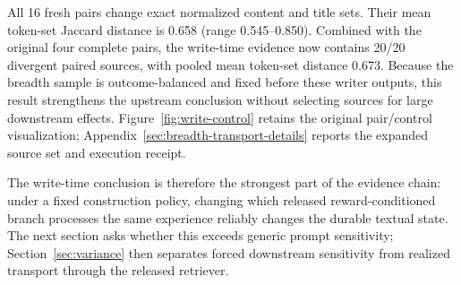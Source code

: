 All 16 fresh pairs change exact normalized content and title sets. Their mean token-set Jaccard distance is 0.658 (range 0.545--0.850). Combined with the original four complete pairs, the write-time evidence now contains 20/20 divergent paired sources, with pooled mean token-set distance 0.673. Because the breadth sample is outcome-balanced and fixed before these writer outputs, this result strengthens the upstream conclusion without selecting sources for large downstream effects. Figure~\ref{fig:write-control} retains the original pair/control visualization; Appendix~\ref{sec:breadth-transport-details} reports the expanded source set and execution receipt.

The write-time conclusion is therefore the strongest part of the evidence chain: under a fixed construction policy, changing which released reward-conditioned branch processes the same experience reliably changes the durable textual state. The next section asks whether this exceeds generic prompt sensitivity; Section~\ref{sec:variance} then separates forced downstream sensitivity from realized transport through the released retriever.
